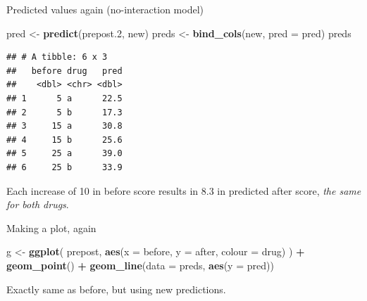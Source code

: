 \documentclass[
  ignorenonframetext,
]{beamer}
\newenvironment{Shaded}{\begin{snugshade}}{\end{snugshade}}
\newcommand{\DataTypeTok}[1]{\textcolor[rgb]{0.13,0.29,0.53}{#1}}
\newcommand{\FloatTok}[1]{\textcolor[rgb]{0.00,0.00,0.81}{#1}}
\newcommand{\KeywordTok}[1]{\textcolor[rgb]{0.13,0.29,0.53}{\textbf{#1}}}
\newcommand{\NormalTok}[1]{#1}
\newcommand{\OperatorTok}[1]{\textcolor[rgb]{0.81,0.36,0.00}{\textbf{#1}}}
\newcommand{\StringTok}[1]{\textcolor[rgb]{0.31,0.60,0.02}{#1}}
\begin{document}
\begin{frame}[fragile]{Predicted values again (no-interaction model)}
\protect\hypertarget{predicted-values-again-no-interaction-model}{}

\begin{Shaded}
\begin{Highlighting}[]
\NormalTok{pred <-}\StringTok{ }\KeywordTok{predict}\NormalTok{(prepost}\FloatTok{.2}\NormalTok{, new)}
\NormalTok{preds <-}\StringTok{ }\KeywordTok{bind_cols}\NormalTok{(new, }\DataTypeTok{pred =}\NormalTok{ pred)}
\NormalTok{preds}
\end{Highlighting}
\end{Shaded}

\begin{verbatim}
## # A tibble: 6 x 3
##   before drug   pred
##    <dbl> <chr> <dbl>
## 1      5 a      22.5
## 2      5 b      17.3
## 3     15 a      30.8
## 4     15 b      25.6
## 5     25 a      39.0
## 6     25 b      33.9
\end{verbatim}

Each increase of 10 in before score results in 8.3 in predicted after
score, \emph{the same for both drugs}.

\end{frame}

\begin{frame}[fragile]{Making a plot, again}
\protect\hypertarget{making-a-plot-again}{}

\begin{Shaded}
\begin{Highlighting}[]
\NormalTok{g <-}\StringTok{ }\KeywordTok{ggplot}\NormalTok{(}
\NormalTok{  prepost,}
  \KeywordTok{aes}\NormalTok{(}\DataTypeTok{x =}\NormalTok{ before, }\DataTypeTok{y =}\NormalTok{ after, }\DataTypeTok{colour =}\NormalTok{ drug)}
\NormalTok{) }\OperatorTok{+}
\StringTok{  }\KeywordTok{geom_point}\NormalTok{() }\OperatorTok{+}
\StringTok{  }\KeywordTok{geom_line}\NormalTok{(}\DataTypeTok{data =}\NormalTok{ preds, }\KeywordTok{aes}\NormalTok{(}\DataTypeTok{y =}\NormalTok{ pred))}
\end{Highlighting}
\end{Shaded}

Exactly same as before, but using new predictions.

\end{frame}
\end{document}
